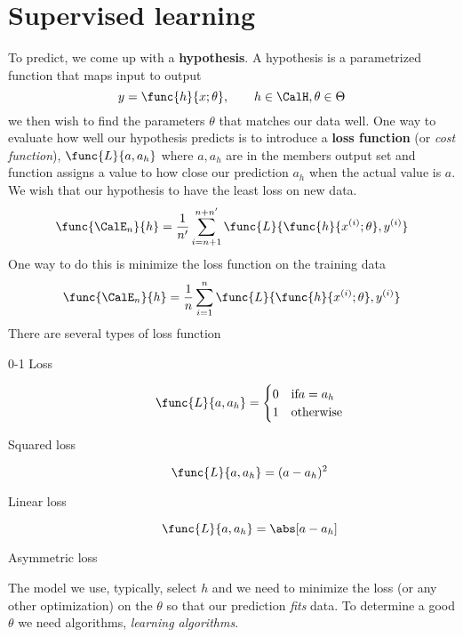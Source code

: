 \chapter{Supervised learning}
To predict, we come up with a \textbf{hypothesis}. A hypothesis is a parametrized function that maps input to output
\begin{equation*}
    y = \func{h}{x ; \theta} , \qquad h \in \CalH, \theta \in \Theta
\end{equation*}
we then wish to find the parameters \(\theta\) that matches our data well. One way to evaluate how well our hypothesis predicts is to introduce a \textbf{loss function} (or \textit{cost function}), \(\func{L}{a,a_h}\) where \(a,a_h\) are in the members output set and function assigns a value to how close our prediction \(a_h\) when the actual value is \(a\). We wish that our hypothesis to have the least loss on new data.
\begin{equation*}
    \func{\CalE_n}{h} = \dfrac{1}{n'} \sum_{i = n + 1}^{n + n'} \func{L}{\func{h}{x^{(i)} ; \theta }, y^{(i)}}
\end{equation*}
One way to do this is minimize the loss function on the training data
\begin{equation*}
    \func{\CalE_n}{h} = \dfrac{1}{n} \sum_{i = 1}^n \func{L}{\func{h}{x^{(i)} ; \theta }, y^{(i)}}
\end{equation*}
There are several types of loss function
\begin{description}
    \item[0-1 Loss]
          \begin{equation*}
              \func{L}{a,a_h} = \begin{cases}
                  0 & \text{if} a = a_h \\
                  1 & \text{otherwise}
              \end{cases}
          \end{equation*}
    \item[Squared loss]
          \begin{equation*}
              \func{L}{a,a_h} = (a - a_h)^2
          \end{equation*}
    \item[Linear loss]
          \begin{equation*}
              \func{L}{a,a_h} = \abs[a - a_h]
          \end{equation*}
    \item[Asymmetric loss]
\end{description}
The model we use, typically, select \(h\) and we need to minimize the loss (or any other optimization) on the \(\theta\) so that our prediction \textit{fits} data. To determine a good \(\theta\) we need algorithms, \textit{learning algorithms}.
